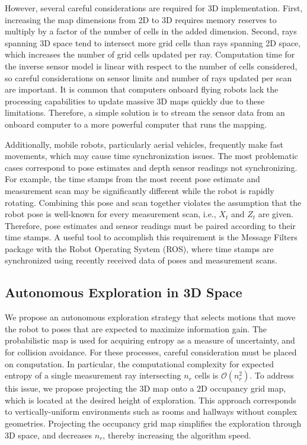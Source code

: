 \documentclass[smallextended]{svjour3}       %
\begin{document}

However, several careful considerations are required for 3D implementation. First, increasing the map dimensions from 2D to 3D requires memory reserves to multiply by a factor of the number of cells in the added dimension. Second, rays spanning 3D space tend to intersect more grid cells than rays spanning 2D space, which increases the number of grid cells updated per ray. Computation time for the inverse sensor model is linear with respect to the number of cells considered, so careful considerations on sensor limits and number of rays updated per scan are important.
It is common that computers onboard flying robots lack the processing capabilities to update massive 3D maps quickly due to these limitations. Therefore, a simple solution is to stream the sensor data from an onboard computer to a more powerful computer that runs the mapping.

Additionally, mobile robots, particularly aerial vehicles, frequently make fast movements, which may cause time synchronization issues. The most problematic cases correspond to pose estimates and depth sensor readings not synchronizing. For example, the time stamps from the most recent pose estimate and measurement scan may be significantly different while the robot is rapidly rotating. Combining this pose and scan together violates the assumption that the robot pose is well-known for every measurement scan, i.e., $X_t$ and $Z_t$ are given. Therefore, pose estimates and sensor readings must be paired according to their time stamps. A useful tool to accomplish this requirement is the Message Filters package with the Robot Operating System (ROS), where time stamps are synchronized using recently received data of poses and measurement scans.

\subsection{Autonomous Exploration in 3D Space}

We propose an autonomous exploration strategy that selects motions that move the robot to poses that are expected to maximize information gain. The probabilistic map is used for acquiring entropy as a measure of uncertainty, and for collision avoidance. For these processes, careful consideration must be placed on computation. In particular, the computational complexity for expected entropy of a single measurement ray intersecting $n_r$ cells is $\mathcal O(n_r^2)$. To address this issue, we propose projecting the 3D map onto a 2D occupancy grid map, which is located at the desired height of exploration. This approach corresponds to vertically-uniform environments such as rooms and hallways without complex geometries. Projecting the occupancy grid map simplifies the exploration through 3D space, and decreases $n_r$, thereby increasing the algorithm speed.
\end{document}
